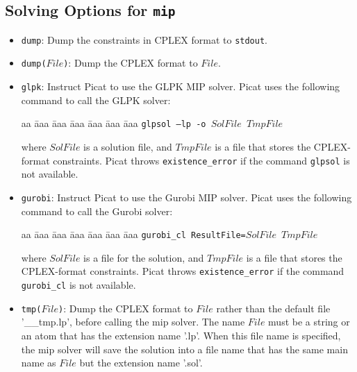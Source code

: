 \subsection{Solving Options for \texttt{mip}}
\begin{itemize}
\item \texttt{dump}: Dump the constraints in CPLEX format to \texttt{stdout}.
\item \texttt{dump($File$)}: Dump the CPLEX format to $File$.
\item \texttt{glpk}: Instruct Picat to use the GLPK MIP solver. Picat uses the following command to call the GLPK solver:
\begin{tabbing}
aa \= aaa \= aaa \= aaa \= aaa \= aaa \= aaa \kill
\> \texttt{glpsol --lp -o $SolFile$ $TmpFile$}
\end{tabbing}
where $SolFile$ is a solution file, and $TmpFile$ is a file that stores the CPLEX-format constraints. Picat throws \texttt{existence\_error} if the command \texttt{glpsol} is not available.
\item \texttt{gurobi}: Instruct Picat to use the Gurobi MIP solver. Picat uses the following command to call the Gurobi solver:
\begin{tabbing}
aa \= aaa \= aaa \= aaa \= aaa \= aaa \= aaa \kill
\> \texttt{gurobi\_cl ResultFile=$SolFile$ $TmpFile$}
\end{tabbing}
where $SolFile$ is a file for the solution, and $TmpFile$ is a file that stores the CPLEX-format constraints. Picat throws \texttt{existence\_error} if the command \texttt{gurobi\_cl} is not available.
\item \texttt{tmp($File$)}: Dump the CPLEX format to $File$ rather than the default file '\_\_tmp.lp', before calling the mip solver. The name $File$  must be a string or an atom that has the extension name '.lp'. When this file name is specified, the mip solver will save the solution into a file name that has the same main name as $File$ but the extension name '.sol'.
\end{itemize}
\ignore{

}
